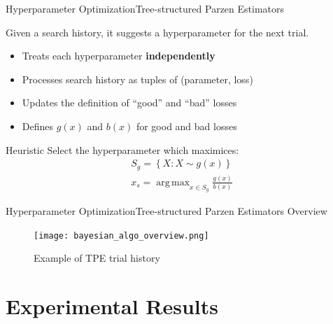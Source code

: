 \documentclass{beamer}
\DeclareMathOperator*{\argmax}{arg\,max}
\begin{document}
            \begin{frame}{Hyperparameter Optimization}{Tree-structured Parzen Estimators}

                Given a search history, it suggests a hyperparameter for the next trial.
                \begin{itemize}
                    \item Treats each hyperparameter \textbf{independently}
                    \item Processes search history as tuples of (parameter, loss)
                    \item Updates the definition of \enquote{good} and \enquote{bad} losses
                    \item Defines $g(x)$ and $b(x)$ for good and bad losses
                \end{itemize}

                \begin{exampleblock}{Heuristic}
                    Select the hyperparameter which maximices:
                    \begin{equation}
                        \begin{gathered}
                            S_g = \left\{X: X \sim g(x)\right\} \\
                            x_s = \argmax_{x \in S_g} \frac{g(x)}{b(x)}
                        \end{gathered}
                    \end{equation}
                \end{exampleblock}
            \end{frame}

            \begin{frame}{Hyperparameter Optimization}{Tree-structured Parzen Estimators Overview}
                \begin{figure}[placement]
                    \centering
                    \texttt{[image: bayesian\_algo\_overview.png]}
                    \caption{Example of TPE trial history \cite{pmlr-v139-tiao21a}}
                \end{figure}
            \end{frame}

    \section{Experimental Results}
\end{document}
